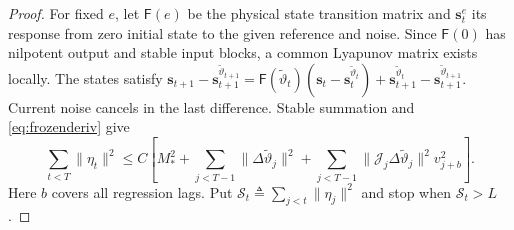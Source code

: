 \documentclass[11pt,reqno]{amsart}
\numberwithin{equation}{section}
\theoremstyle{definition}
\theoremstyle{remark}
\newcommand{\etac}{\widetilde{\vartheta}}
\begin{document}
\begin{proof}
For fixed $e$, let $\mathsf F(e)$ be the physical state transition matrix and $\mathbf s_t^e$ its response from zero initial state to the given reference and noise. Since $\mathsf F(0)$ has nilpotent output and stable input blocks, a common Lyapunov matrix exists locally. The states satisfy $\mathbf s_{t+1}-\mathbf s_{t+1}^{\etac_{t+1}}=\mathsf F(\etac_t)(\mathbf s_t-\mathbf s_t^{\etac_t})+\mathbf s_{t+1}^{\etac_t}-\mathbf s_{t+1}^{\etac_{t+1}}$. Current noise cancels in the last difference. Stable summation and \eqref{eq:frozenderiv} give
\begin{equation}\label{eq:etaestimate}
 \sum_{t<T}\|\eta_t\|^2\le C\left[M_*^2+\sum_{j<T-1}\|\Delta\etac_j\|^2+\sum_{j<T-1}\|\mathcal J_j\Delta\etac_j\|^2v_{j+b}^2\right].
\end{equation}
Here $b$ covers all regression lags. Put $\mathcal S_t\triangleq\sum_{j<t}\|\eta_j\|^2$ and stop when $\mathcal S_t>L$.


\end{proof}
\end{document}
